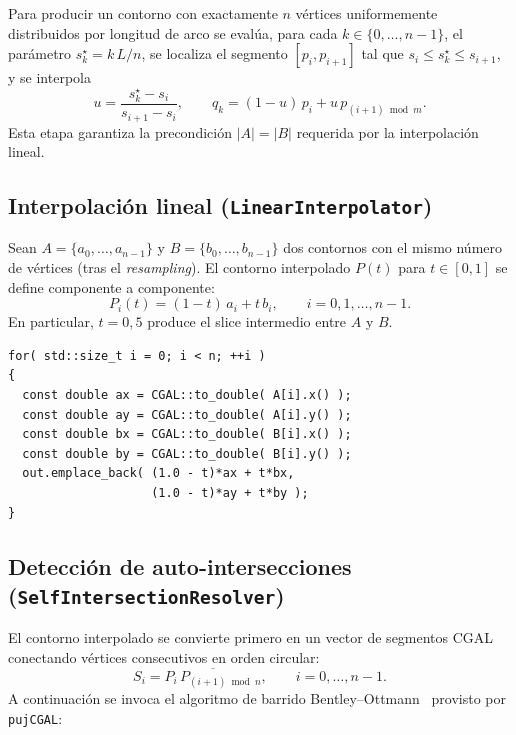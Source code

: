 \documentclass[conference]{IEEEtran}
\begin{document}
Para producir un contorno con exactamente $n$ vértices
uniformemente distribuidos por longitud de arco se evalúa,
para cada $k \in \{0,\dots,n-1\}$, el parámetro
$s_k^{\star} = k \, L / n$, se localiza el segmento
$[p_i, p_{i+1}]$ tal que $s_i \leq s_k^{\star} \leq s_{i+1}$,
y se interpola
\begin{equation}
  u = \frac{s_k^{\star} - s_i}{s_{i+1} - s_i},
  \qquad
  q_k = (1 - u)\, p_i + u \, p_{(i+1) \bmod m}.
\end{equation}
Esta etapa garantiza la precondición $|A| = |B|$ requerida por
la interpolación lineal.

\subsection{Interpolación lineal
            (\texttt{LinearInterpolator})}
Sean $A = \{a_0, \dots, a_{n-1}\}$ y
$B = \{b_0, \dots, b_{n-1}\}$ dos contornos con el mismo
número de vértices (tras el \textit{resampling}). El contorno
interpolado $P(t)$ para $t \in [0,1]$ se define
componente a componente:
\begin{equation}
  P_i(t) = (1 - t)\, a_i + t \, b_i,
  \qquad i = 0, 1, \dots, n-1.
\end{equation}
En particular, $t = 0{,}5$ produce el slice intermedio entre
$A$ y $B$.

\begin{lstlisting}[caption={Núcleo de la interpolación lineal.}]
for( std::size_t i = 0; i < n; ++i )
{
  const double ax = CGAL::to_double( A[i].x() );
  const double ay = CGAL::to_double( A[i].y() );
  const double bx = CGAL::to_double( B[i].x() );
  const double by = CGAL::to_double( B[i].y() );
  out.emplace_back( (1.0 - t)*ax + t*bx,
                    (1.0 - t)*ay + t*by );
}
\end{lstlisting}

\subsection{Detección de auto-intersecciones
            (\texttt{SelfIntersectionResolver})}
El contorno interpolado se convierte primero en un vector de
segmentos CGAL conectando vértices consecutivos en orden
circular:
\begin{equation}
  S_i = \overline{P_i \, P_{(i+1) \bmod n}},
  \qquad i = 0,\dots,n-1.
\end{equation}
A continuación se invoca el algoritmo de barrido
Bentley--Ottmann~\cite{bentley1979} provisto por
\texttt{pujCGAL}:
\end{document}
